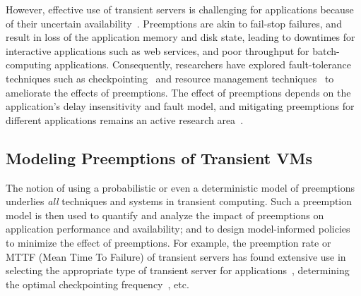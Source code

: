 
However, effective use of transient servers is challenging for applications because of their uncertain availability~\cite{transient}. 
Preemptions are akin to fail-stop failures, and result in loss of the application memory and disk state, leading to downtimes for interactive applications such as web services, and poor throughput for batch-computing applications. 
Consequently, researchers have explored fault-tolerance techniques such as checkpointing~\cite{flint, marathe2014exploiting, spoton} and resource management techniques~\cite{exosphere} to ameliorate the effects of preemptions. %
The effect of preemptions depends on the application's delay insensitivity and fault model, and mitigating preemptions for different applications remains an active research area~\cite{hourglass-eurosys19}. 




\vspace*{\subsecspace}
\subsection{Modeling Preemptions of Transient VMs}


The notion of using a probabilistic or even a deterministic model of preemptions underlies \emph{all} techniques and systems in transient computing. 
%
Such a preemption model is then used to quantify and analyze the impact of preemptions on application performance and availability; and to design model-informed policies to minimize the effect of preemptions. 
%
For example, the preemption rate or MTTF (Mean Time To Failure) of transient servers has found extensive use in selecting the appropriate type of transient server for applications~\cite{exosphere, spoton}, determining the optimal checkpointing frequency~\cite{flint, marathe2014exploiting, proteus-eur17, ghit-spark-hpdc}, etc. 


